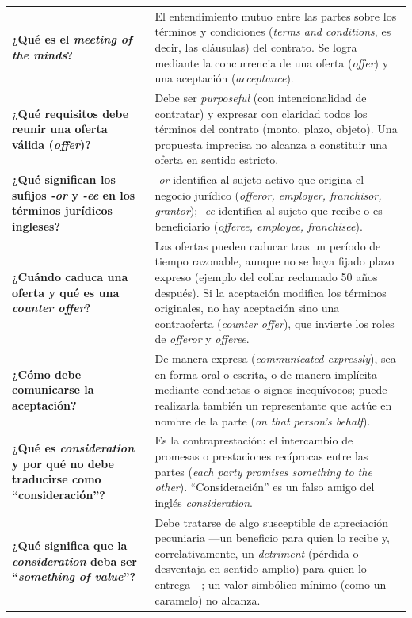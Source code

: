 \documentclass[12pt,oneside]{book}
\begin{document}
\begin{longtable}{
    >{\raggedright\arraybackslash\bfseries}p{}
    >{\raggedright\arraybackslash}p{}
}
¿Qué es el \textit{meeting of the minds}? &
El entendimiento mutuo entre las partes sobre los términos y condiciones (\textit{terms and conditions}, es decir, las cláusulas) del contrato. Se logra mediante la concurrencia de una oferta (\textit{offer}) y una aceptación (\textit{acceptance}). \\

¿Qué requisitos debe reunir una oferta válida (\textit{offer})? &
Debe ser \textit{purposeful} (con intencionalidad de contratar) y expresar con claridad todos los términos del contrato (monto, plazo, objeto). Una propuesta imprecisa no alcanza a constituir una oferta en sentido estricto. \\

¿Qué significan los sufijos \textit{-or} y \textit{-ee} en los términos jurídicos ingleses? &
\textit{-or} identifica al sujeto activo que origina el negocio jurídico (\textit{offeror, employer, franchisor, grantor}); \textit{-ee} identifica al sujeto que recibe o es beneficiario (\textit{offeree, employee, franchisee}). \\

¿Cuándo caduca una oferta y qué es una \textit{counter offer}? &
Las ofertas pueden caducar tras un período de tiempo razonable, aunque no se haya fijado plazo expreso (ejemplo del collar reclamado 50 años después). Si la aceptación modifica los términos originales, no hay aceptación sino una contraoferta (\textit{counter offer}), que invierte los roles de \textit{offeror} y \textit{offeree}. \\

¿Cómo debe comunicarse la aceptación? &
De manera expresa (\textit{communicated expressly}), sea en forma oral o escrita, o de manera implícita mediante conductas o signos inequívocos; puede realizarla también un representante que actúe en nombre de la parte (\textit{on that person's behalf}). \\

¿Qué es \textit{consideration} y por qué no debe traducirse como ``consideración''? &
Es la contraprestación: el intercambio de promesas o prestaciones recíprocas entre las partes (\textit{each party promises something to the other}). ``Consideración'' es un falso amigo del inglés \textit{consideration}. \\

¿Qué significa que la \textit{consideration} deba ser ``\textit{something of value}''? &
Debe tratarse de algo susceptible de apreciación pecuniaria —un beneficio para quien lo recibe y, correlativamente, un \textit{detriment} (pérdida o desventaja en sentido amplio) para quien lo entrega—; un valor simbólico mínimo (como un caramelo) no alcanza. \\


\end{longtable}
\end{document}
